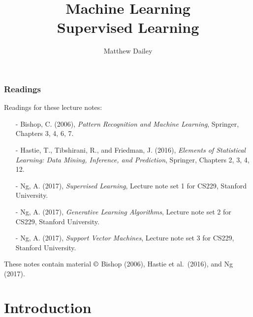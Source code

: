 \documentclass{beamer}
\title[Machine Learning]{Machine Learning\\Supervised Learning}
\author{Matthew Dailey}
\institute[ICT-AIT]{
  Information and Communication Technologies \\
  Asian Institute of Technology}
\date{}
\begin{document}


\frame{\titlepage}

%

\begin{frame}
\frametitle{Readings}

Readings for these lecture notes:
\begin{itemize}
\item[-] Bishop, C. (2006), \textit{Pattern Recognition and Machine Learning},
  Springer, Chapters 3, 4, 6, 7.
\item[-] Hastie, T., Tibshirani, R., and Friedman, J. (2016),
  \textit{Elements of Statistical Learning: Data Mining, Inference, and
    Prediction}, Springer, Chapters 2, 3, 4, 12.
\item[-] Ng, A. (2017), \textit{Supervised Learning}, Lecture note set
  1 for CS229, Stanford University.
\item[-] Ng, A. (2017), \textit{Generative Learning Algorithms},
  Lecture note set 2 for CS229, Stanford University.
\item[-] Ng, A. (2017), \textit{Support Vector Machines},
  Lecture note set 3 for CS229, Stanford University.
\end{itemize}

These notes contain material $\copyright$ Bishop (2006), Hastie et
al.\ (2016), and Ng (2017).

\end{frame}

\section{Introduction}
\end{document}
